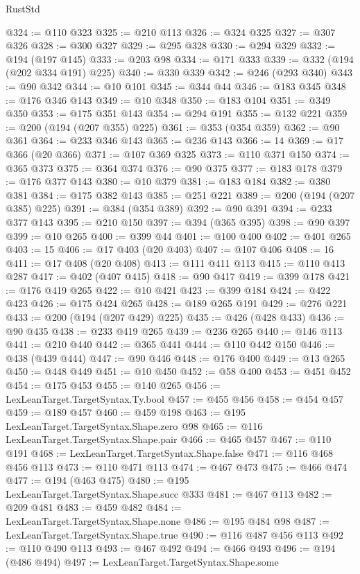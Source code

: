 \begin{lexlean}{RustStd}
\begin{coremodule}
@324 := @110 @323
@325 := @210 @113
@326 := @324 @325
@327 := @307 @326
@328 := @300 @327
@329 := @295 @328
@330 := @294 @329
@332 := @194 (@197 @145)
@333 := @203 @98
@334 := @171 @333
@339 := @332 (@194 (@202 @334 @191) @225)
@340 := @330 @339
@342 := @246 (@293 @340)
@343 := @90 @342
@344 := @10 @101
@345 := @344 @44
@346 := @183 @345
@348 := @176 @346 @143
@349 := @10 @348
@350 := @183 @104
@351 := @349 @350
@353 := @175 @351 @143
@354 := @294 @191
@355 := @132 @221
@359 := @200 (@194 (@207 @355) @225)
@361 := @353 (@354 @359)
@362 := @90 @361
@364 := @233 @346 @143
@365 := @236 @143
@366 := 14
@369 := @17 @366 (@20 @366)
@371 := @107 @369 @325
@373 := @110 @371 @150
@374 := @365 @373
@375 := @364 @374
@376 := @90 @375
@377 := @183 @178
@379 := @176 @377 @143
@380 := @10 @379
@381 := @183 @184
@382 := @380 @381
@384 := @175 @382 @143
@385 := @251 @221
@389 := @200 (@194 (@207 @385) @225)
@391 := @384 (@354 @389)
@392 := @90 @391
@394 := @233 @377 @143
@395 := @210 @150
@397 := @394 (@365 @395)
@398 := @90 @397
@399 := @10 @265
@400 := @399 @44
@401 := @100 @400
@402 := @401 @265
@403 := 15
@406 := @17 @403 (@20 @403)
@407 := @107 @406
@408 := 16
@411 := @17 @408 (@20 @408)
@413 := @111 @411 @113
@415 := @110 @413 @287
@417 := @402 (@407 @415)
@418 := @90 @417
@419 := @399 @178
@421 := @176 @419 @265
@422 := @10 @421
@423 := @399 @184
@424 := @422 @423
@426 := @175 @424 @265
@428 := @189 @265 @191
@429 := @276 @221
@433 := @200 (@194 (@207 @429) @225)
@435 := @426 (@428 @433)
@436 := @90 @435
@438 := @233 @419 @265
@439 := @236 @265
@440 := @146 @113
@441 := @210 @440
@442 := @365 @441
@444 := @110 @442 @150
@446 := @438 (@439 @444)
@447 := @90 @446
@448 := @176 @400
@449 := @13 @265
@450 := @448 @449
@451 := @10 @450
@452 := @58 @400
@453 := @451 @452
@454 := @175 @453
@455 := @140 @265
@456 := LexLeanTarget.TargetSyntax.Ty.bool
@457 := @455 @456
@458 := @454 @457
@459 := @189 @457
@460 := @459 @198
@463 := @195 LexLeanTarget.TargetSyntax.Shape.zero @98
@465 := @116 LexLeanTarget.TargetSyntax.Shape.pair
@466 := @465 @457
@467 := @110 @191
@468 := LexLeanTarget.TargetSyntax.Shape.false
@471 := @116 @468 @456 @113
@473 := @110 @471 @113
@474 := @467 @473
@475 := @466 @474
@477 := @194 (@463 @475)
@480 := @195 LexLeanTarget.TargetSyntax.Shape.succ @333
@481 := @467 @113
@482 := @209 @481
@483 := @459 @482
@484 := LexLeanTarget.TargetSyntax.Shape.none
@486 := @195 @484 @98
@487 := LexLeanTarget.TargetSyntax.Shape.true
@490 := @116 @487 @456 @113
@492 := @110 @490 @113
@493 := @467 @492
@494 := @466 @493
@496 := @194 (@486 @494)
@497 := LexLeanTarget.TargetSyntax.Shape.some

\end{coremodule}
\end{lexlean}
